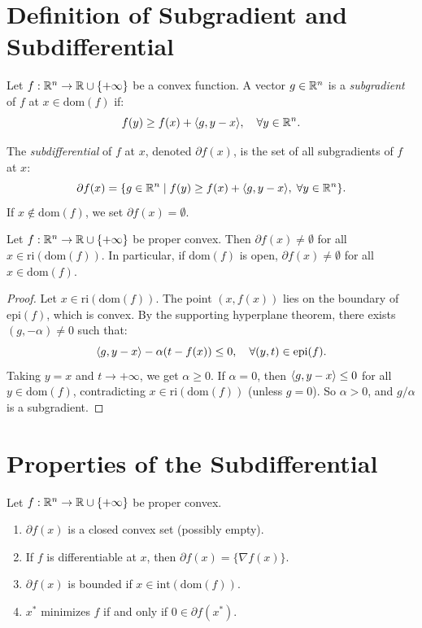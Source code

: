 \section{Definition of Subgradient and Subdifferential}

\begin{definition}[Subgradient]
Let $f : \mathbb{R}^n \to \mathbb{R} \cup \{+\infty\}$ be a convex function. A vector $g \in \mathbb{R}^n$
is a \emph{subgradient} of $f$ at $x \in \mathrm{dom}(f)$ if:
\[
    f(y) \geq f(x) + \langle g, y - x \rangle, \quad \forall y \in \mathbb{R}^n.
\]
\end{definition}

\begin{definition}[Subdifferential]
The \emph{subdifferential} of $f$ at $x$, denoted $\partial f(x)$, is the set of all
subgradients of $f$ at $x$:
\[
    \partial f(x) = \{g \in \mathbb{R}^n \mid f(y) \geq f(x) + \langle g, y-x \rangle, \; \forall y \in \mathbb{R}^n\}.
\]
If $x \notin \mathrm{dom}(f)$, we set $\partial f(x) = \emptyset$.
\end{definition}

\begin{theorem}
\label{thm:sg_existence}
Let $f : \mathbb{R}^n \to \mathbb{R} \cup \{+\infty\}$ be proper convex. Then
$\partial f(x) \neq \emptyset$ for all $x \in \mathrm{ri}(\mathrm{dom}(f))$.
In particular, if $\mathrm{dom}(f)$ is open, $\partial f(x) \neq \emptyset$ for all
$x \in \mathrm{dom}(f)$.
\end{theorem}

\begin{proof}
Let $x \in \mathrm{ri}(\mathrm{dom}(f))$. The point $(x, f(x))$ lies on the boundary
of $\mathrm{epi}(f)$, which is convex. By the supporting hyperplane theorem, there
exists $(g, -\alpha) \neq 0$ such that:
\[
    \langle g, y - x \rangle - \alpha(t - f(x)) \leq 0, \quad \forall (y,t) \in \mathrm{epi}(f).
\]
Taking $y = x$ and $t \to +\infty$, we get $\alpha \geq 0$. If $\alpha = 0$, then
$\langle g, y-x \rangle \leq 0$ for all $y \in \mathrm{dom}(f)$, contradicting
$x \in \mathrm{ri}(\mathrm{dom}(f))$ (unless $g = 0$). So $\alpha > 0$, and
$g/\alpha$ is a subgradient.
\end{proof}

\section{Properties of the Subdifferential}

\begin{theorem}
\label{thm:subdiff_props}
Let $f : \mathbb{R}^n \to \mathbb{R} \cup \{+\infty\}$ be proper convex.
\begin{enumerate}
    \item $\partial f(x)$ is a closed convex set (possibly empty).
    \item If $f$ is differentiable at $x$, then $\partial f(x) = \{\nabla f(x)\}$.
    \item $\partial f(x)$ is bounded if $x \in \mathrm{int}(\mathrm{dom}(f))$.
    \item $x^*$ minimizes $f$ if and only if $0 \in \partial f(x^*)$.
\end{enumerate}
\end{theorem}

